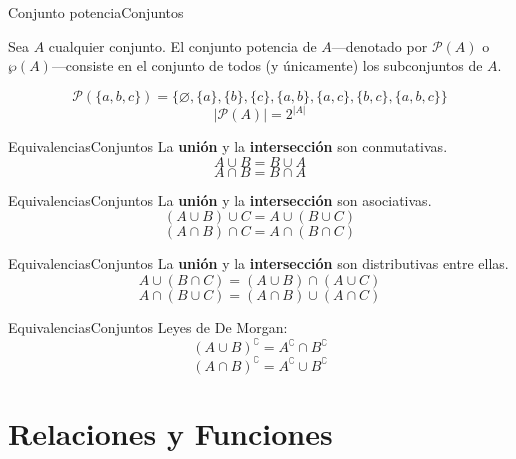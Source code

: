 \documentclass[spanish]{beamer}
\begin{document}
\begin{frame}{Conjunto potencia}{Conjuntos}
    \begin{definition}
        Sea $A$ cualquier conjunto. El \alert{conjunto potencia} de $A$---denotado por $\mathscr{P}(A)$ o $\wp(A)$---consiste en el conjunto de todos (y únicamente) los subconjuntos de $A$.
    \end{definition}
    \pause
    \bigskip
    \[\mathscr{P}(\{a,b,c\}) = \{\varnothing, \{a\}, \{b\}, \{c\}, \{a,b\}, \{a,c\}, \{b,c\}, \{a,b,c\}\}\] \pause
    \bigskip
    \[|\mathscr{P}(A)| = 2^{|A|}\]
\end{frame}

\begin{frame}{Equivalencias}{Conjuntos}
    \label{fr:equivalence}
    La \textbf{unión} y la \textbf{intersección} son \alert{conmutativas}. \pause
    \bigskip
    \[A \cup B = B \cup A\] \pause
    \bigskip
    \[A \cap B = B \cap A\]
\end{frame}

\begin{frame}{Equivalencias}{Conjuntos}
    La \textbf{unión} y la \textbf{intersección} son \alert{asociativas}. \pause
    \bigskip
    \[(A \cup B) \cup C = A \cup (B \cup C)\] \pause
    \bigskip
    \[(A \cap B) \cap C = A \cap (B \cap C)\]
\end{frame}

\begin{frame}{Equivalencias}{Conjuntos}
    La \textbf{unión} y la \textbf{intersección} son \alert{distributivas} entre ellas. \pause
    \bigskip
    \[A \cup (B \cap C) = (A \cup B) \cap (A \cup C)\] \pause
    \bigskip
    \[A \cap (B \cup C) = (A \cap B) \cup (A \cap C)\]
\end{frame}

\begin{frame}{Equivalencias}{Conjuntos}
    Leyes de \alert{De Morgan}: \pause
    \bigskip
    \[(A \cup B)^\complement = A^\complement \cap B^\complement\] \pause
    \[(A \cap B)^\complement = A^\complement \cup B^\complement\]
    \bigskip
    \hyperlink{fr:logicequiv}{}
\end{frame}

\section{Relaciones y Funciones}
\label{sec:relfunc}
\end{document}
